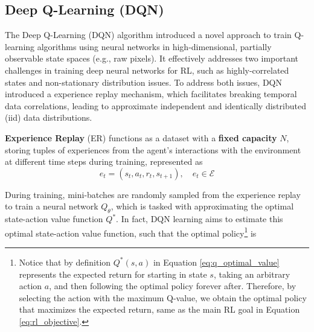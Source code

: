 


\subsection{Deep Q-Learning (DQN)}
\label{sec:dqn}
The Deep Q-Learning (DQN) \cite{mnih2013playing, mnih2015human} algorithm introduced a novel approach to train Q-learning algorithms using neural networks in high-dimensional, partially observable state spaces (e.g., raw pixels). It effectively addresses two important challenges in training deep neural networks for RL, such as highly-correlated states and non-stationary distribution issues.  To address both issues, DQN introduced a experience replay mechanism, which facilitates breaking temporal data correlations, leading to approximate independent and identically distributed (iid) data distributions.


\textbf{Experience Replay} (ER) functions as a dataset with a \textbf{fixed capacity} $N$, storing tuples of experiences from the agent's interactions with the environment at different time steps during training, represented as
$$e_t = (s_t, a_t, r_t, s_{t+1}), \quad e_t \in \mathcal{E}$$


During training, mini-batches are randomly sampled from the experience replay to train a neural network $Q_\theta$, which is tasked with approximating the optimal state-action value function $Q^*$. In fact, DQN learning aims to estimate this optimal state-action value function, such that the optimal policy\footnote{Notice that by definition $Q^*(s,a)$ in Equation \ref{eq:q_optimal_value} represents the expected return for starting in state $s$, taking an arbitrary action $a$, and then following the optimal policy forever after. Therefore, by selecting the action with the maximum Q-value, we obtain the optimal policy that maximizes the expected return, same as the main RL goal in Equation \ref{eq:rl_objective}.} is

